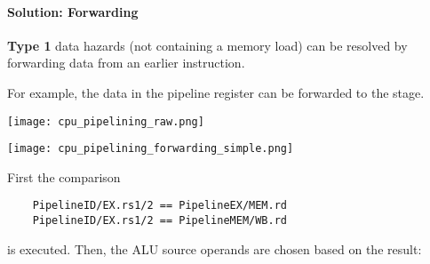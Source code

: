 \renewcommand{\arraystretch}{1}
\setlength\tabcolsep{\oldtabcolsep}



\paragraph{Solution: Forwarding}
\textbf{Type 1} data hazards (not containing a memory load) can be resolved by forwarding data from an earlier instruction.

\newpar{}
For example, the data in the  pipeline register can be forwarded to the  stage.

\texttt{[image: cpu\_pipelining\_raw.png]}

\begin{center}
    \texttt{[image: cpu\_pipelining\_forwarding\_simple.png]}
\end{center}
First the comparison
\begin{lstlisting}
    PipelineID/EX.rs1/2 == PipelineEX/MEM.rd
    PipelineID/EX.rs1/2 == PipelineMEM/WB.rd
\end{lstlisting}
is executed. Then, the ALU source operands are chosen based on the result:

